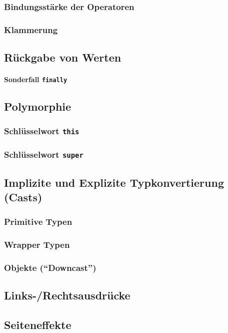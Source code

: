 	\subsubsection{Bindungsstärke der Operatoren}
	
	\subsubsection{Klammerung}

\subsection{Rückgabe von Werten}
	
	\paragraph{Sonderfall \texttt{finally}}

\subsection{Polymorphie}
	
	\subsubsection{Schlüsselwort \lstinline|this|}
	
	\subsubsection{Schlüsselwort \lstinline|super|}

\subsection{Implizite und Explizite Typkonvertierung (Casts)}
	
	\subsubsection{Primitive Typen}
	
	\subsubsection{Wrapper Typen}
	
	\subsubsection{Objekte (\enquote{Downcast})}

\subsection{Links-/Rechtsausdrücke}

\subsection{Seiteneffekte}
